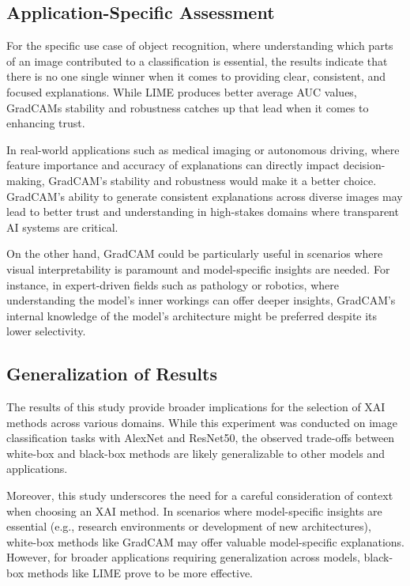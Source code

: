 \documentclass{article}
\begin{document}
\subsection{Application-Specific Assessment}
For the specific use case of object recognition, where understanding which parts of an image contributed to a classification is essential, the results indicate that there is no one single winner when it comes to providing clear, consistent, and focused explanations.
While LIME produces better average AUC values, GradCAMs stability and robustness catches up that lead when it comes to enhancing trust.

In real-world applications such as medical imaging or autonomous driving, where feature importance and accuracy of explanations can directly impact decision-making, GradCAM’s stability and robustness would make it a better choice. GradCAM’s ability to generate consistent explanations across diverse images may lead to better trust and understanding in high-stakes domains where transparent AI systems are critical.

On the other hand, GradCAM could be particularly useful in scenarios where visual interpretability is paramount and model-specific insights are needed. For instance, in expert-driven fields such as pathology or robotics, where understanding the model’s inner workings can offer deeper insights, GradCAM’s internal knowledge of the model’s architecture might be preferred despite its lower selectivity.


\subsection{Generalization of Results}

The results of this study provide broader implications for the selection of XAI methods across various domains. While this experiment was conducted on image classification tasks with AlexNet and ResNet50, the observed trade-offs between white-box and black-box methods are likely generalizable to other models and applications. 

Moreover, this study underscores the need for a careful consideration of context when choosing an XAI method. In scenarios where model-specific insights are essential (e.g., research environments or development of new architectures), white-box methods like GradCAM may offer valuable model-specific explanations. However, for broader applications requiring generalization across models, black-box methods like LIME prove to be more effective.
\end{document}
